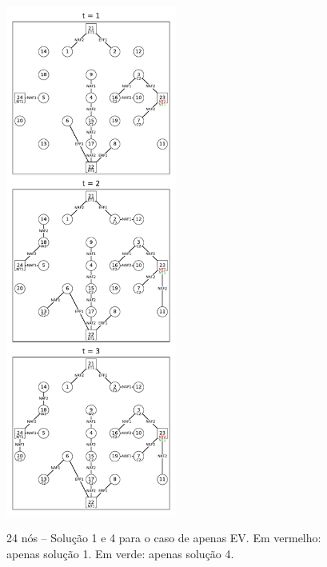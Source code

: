 \newpage
\begin{figure}[H]
 	\centering
    \caption{24 nós -- Solução 1 e 4 para o caso de apenas EV. Em vermelho: apenas solução 1. Em verde: apenas solução 4.}
    \includegraphics[width=0.5\textwidth]{cap4/resultados/24_ev1.pdf}\\
    \label{fig:24_ev1_4}
\end{figure}

